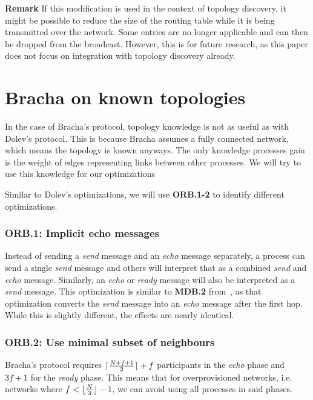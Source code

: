 \textbf{Remark}
If this modification is used in the context of topology discovery, it might be possible to reduce the size of the routing table while it is being transmitted over the network. Some entries are no longer applicable and can then be dropped from the broadcast. However, this is for future research, as this paper does not focus on integration with topology discovery already.

\section{Bracha on known topologies}
\label{contr-bracha}
In the case of Bracha's protocol, topology knowledge is not as useful as with Dolev's protocol. This is because Bracha assumes a fully connected network, which means the topology is known anyways. The only knowledge processes gain is the weight of edges representing links between other processes. We will try to use this knowledge for our optimizations

Similar to Dolev's optimizations, we will use \textbf{ORB.1-2} to identify different optimizations.

\subsubsection{ORB.1: Implicit echo messages}
Instead of sending a \textit{send} message and an \textit{echo} message separately, a process can send a single \textit{send} message and others will interpret that as a combined \textit{send} and \textit{echo} message. Similarly, an \textit{echo} or \textit{ready} message will also be interpreted as a \textit{send} message. This optimization is similar to \textbf{MDB.2} from~\cite{bonomi2021practical}, as that optimization converts the \textit{send} message into an \textit{echo} message after the first hop. While this is slightly different, the effects are nearly identical.


\subsubsection{ORB.2: Use minimal subset of neighbours}
Bracha's protocol requires $\lceil\frac{N+f+1}{2}\rceil + f$ participants in the \textit{echo} phase and $3f+1$ for the \textit{ready} phase. This means that for overprovisioned networks, i.e. networks where $f < \lfloor\frac{N}{3}\rfloor - 1$, we can avoid using all processes in said phases.


